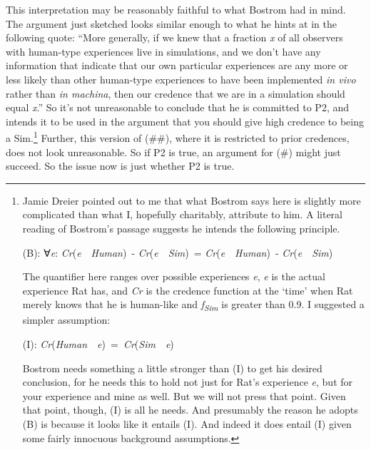 \documentclass[
  11pt,
  letterpaper,
  DIV=11,
  numbers=noendperiod,
  twoside]{scrartcl}
\begin{document}
This interpretation may be reasonably faithful to what Bostrom had in
mind. The argument just sketched looks similar enough to what he hints
at in the following quote: ``More generally, if we knew that a fraction
\emph{x} of all observers with human-type experiences live in
simulations, and we don't have any information that indicate that our
own particular experiences are any more or less likely than other
human-type experiences to have been implemented \emph{in vivo} rather
than \emph{in machina}, then our credence that we are in a simulation
should equal \emph{x}.'' So it's not unreasonable to conclude that he is
committed to P2, and intends it to be used in the argument that you
should give high credence to being a Sim.\footnote{Jamie Dreier pointed
  out to me that what Bostrom says here is slightly more complicated
  than what I, hopefully charitably, attribute to him. A literal reading
  of Bostrom's passage suggests he intends the following principle.

  (B): ∀\emph{e}: \emph{Cr}(\emph{e}~\textbar~\emph{Human})~-
  \emph{Cr}(\emph{e}~\textbar~\emph{Sim})~=
  \emph{Cr}(\emph{e}~\textbar~\emph{Human})~-
  \emph{Cr}(\emph{e}~\textbar~\emph{Sim})

  The quantifier here ranges over possible experiences \emph{e},
  \emph{e} is the actual experience Rat has, and \emph{Cr} is the
  credence function at the `time' when Rat merely knows that he is
  human-like and \emph{f\textsubscript{Sim}} is greater than 0.9. I
  suggested a simpler assumption:

  (I):
  \emph{Cr}(\emph{Human}~\textbar~\emph{e})~=~\emph{Cr}(\emph{Sim}~\textbar~\emph{e})

  Bostrom needs something a little stronger than (I) to get his desired
  conclusion, for he needs this to hold not just for Rat's experience
  \emph{e}, but for your experience and mine as well. But we will not
  press that point. Given that point, though, (I) is all he needs. And
  presumably the reason he adopts (B) is because it looks like it
  entails (I). And indeed it does entail (I) given some fairly innocuous
  background assumptions.} Further, this version of (\#\#), where it is
restricted to prior credences, does not look unreasonable. So if P2 is
true, an argument for (\#) might just succeed. So the issue now is just
whether P2 is true.
\end{document}
